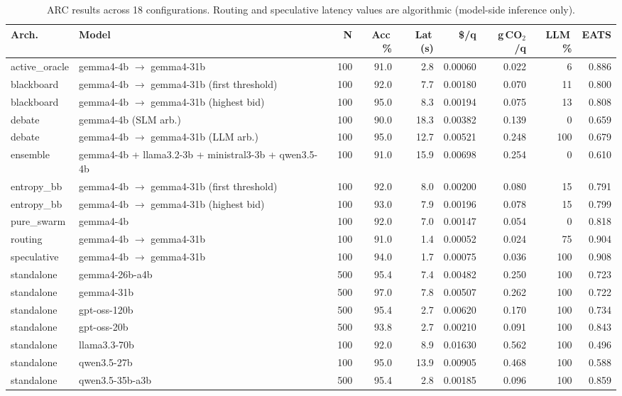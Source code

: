 \begin{table}[htbp]
\centering
\caption{ARC results across 18 configurations. Routing and speculative latency values are algorithmic (model-side inference only).}
\label{tab:result-arc}
\scriptsize
\renewcommand{\arraystretch}{1.15}
\begin{tabularx}{\linewidth}{@{} l X r r r r r r r @{}}
\toprule
\textbf{Arch.} & \textbf{Model} & \textbf{N} & \textbf{Acc\,\%} & \textbf{Lat\,(s)} & \textbf{\$/q} & \textbf{g\,CO$_2$/q} & \textbf{LLM\,\%} & \textbf{EATS} \\
\midrule
active\_oracle & gemma4-4b $\rightarrow$ gemma4-31b & 100 & 91.0 & 2.8 & 0.00060 & 0.022 & 6 & 0.886 \\
blackboard & gemma4-4b $\rightarrow$ gemma4-31b (first threshold) & 100 & 92.0 & 7.7 & 0.00180 & 0.070 & 11 & 0.800 \\
blackboard & gemma4-4b $\rightarrow$ gemma4-31b (highest bid) & 100 & 95.0 & 8.3 & 0.00194 & 0.075 & 13 & 0.808 \\
debate & gemma4-4b (SLM arb.) & 100 & 90.0 & 18.3 & 0.00382 & 0.139 & 0 & 0.659 \\
debate & gemma4-4b $\rightarrow$ gemma4-31b (LLM arb.) & 100 & 95.0 & 12.7 & 0.00521 & 0.248 & 100 & 0.679 \\
ensemble & gemma4-4b + llama3.2-3b + ministral3-3b + qwen3.5-4b & 100 & 91.0 & 15.9 & 0.00698 & 0.254 & 0 & 0.610 \\
entropy\_bb & gemma4-4b $\rightarrow$ gemma4-31b (first threshold) & 100 & 92.0 & 8.0 & 0.00200 & 0.080 & 15 & 0.791 \\
entropy\_bb & gemma4-4b $\rightarrow$ gemma4-31b (highest bid) & 100 & 93.0 & 7.9 & 0.00196 & 0.078 & 15 & 0.799 \\
pure\_swarm & gemma4-4b & 100 & 92.0 & 7.0 & 0.00147 & 0.054 & 0 & 0.818 \\
routing & gemma4-4b $\rightarrow$ gemma4-31b & 100 & 91.0 & 1.4 & 0.00052 & 0.024 & 75 & 0.904 \\
speculative & gemma4-4b $\rightarrow$ gemma4-31b & 100 & 94.0 & 1.7 & 0.00075 & 0.036 & 100 & 0.908 \\
standalone & gemma4-26b-a4b & 500 & 95.4 & 7.4 & 0.00482 & 0.250 & 100 & 0.723 \\
standalone & gemma4-31b & 500 & 97.0 & 7.8 & 0.00507 & 0.262 & 100 & 0.722 \\
standalone & gpt-oss-120b & 500 & 95.4 & 2.7 & 0.00620 & 0.170 & 100 & 0.734 \\
standalone & gpt-oss-20b & 500 & 93.8 & 2.7 & 0.00210 & 0.091 & 100 & 0.843 \\
standalone & llama3.3-70b & 100 & 92.0 & 8.9 & 0.01630 & 0.562 & 100 & 0.496 \\
standalone & qwen3.5-27b & 100 & 95.0 & 13.9 & 0.00905 & 0.468 & 100 & 0.588 \\
standalone & qwen3.5-35b-a3b & 500 & 95.4 & 2.8 & 0.00185 & 0.096 & 100 & 0.859 \\
\bottomrule
\end{tabularx}
\end{table}

